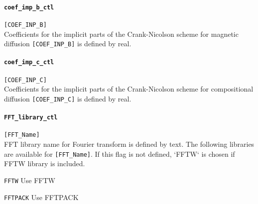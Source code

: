 \paragraph{\tt coef\_imp\_b\_ctl}
\label{href_t:coef_imp_b_ctl}
\verb|[COEF_INP_B]| \\
Coefficients for the implicit parts of the Crank-Nicolson scheme for magnetic diffusion \verb|[COEF_INP_B]| is defined by real.

\paragraph{\tt coef\_imp\_c\_ctl}
\label{href_t:coef_imp_c_ctl}
\verb|[COEF_INP_C]| \\
Coefficients for the implicit parts of the Crank-Nicolson scheme for compositional diffusion \verb|[COEF_INP_C]| is defined by real. 


\paragraph{\tt FFT\_library\_ctl}
\label{href_t:FFT_library_ctl}
\verb|[FFT_Name]| \\
FFT library name for Fourier transform is defined by text. The following libraries are available for \verb|[FFT_Name]|. 
If this flag is not defined, `FFTW` is chosen if FFTW library is included.
%
\begin{description}
\item{\tt FFTW}		Use FFTW
\item{\tt FFTPACK}	Use FFTPACK
\end{description}
%

